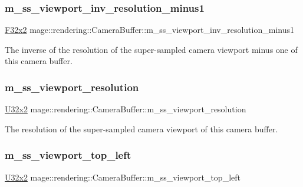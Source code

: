 \subsubsection{\texorpdfstring{m\+\_\+ss\+\_\+viewport\+\_\+inv\+\_\+resolution\+\_\+minus1}{m\_ss\_viewport\_inv\_resolution\_minus1}}
{\footnotesize\ttfamily \hyperlink{namespacemage_aa87237ad091f5cd7da612b8523fc108f}{F32x2} mage\+::rendering\+::\+Camera\+Buffer\+::m\+\_\+ss\+\_\+viewport\+\_\+inv\+\_\+resolution\+\_\+minus1}

The inverse of the resolution of the super-\/sampled camera viewport minus one of this camera buffer. \hypertarget{structmage_1_1rendering_1_1_camera_buffer_a96b17352187228ee2265be33d3f2d159}{}\label{structmage_1_1rendering_1_1_camera_buffer_a96b17352187228ee2265be33d3f2d159} 
\subsubsection{\texorpdfstring{m\+\_\+ss\+\_\+viewport\+\_\+resolution}{m\_ss\_viewport\_resolution}}
{\footnotesize\ttfamily \hyperlink{namespacemage_a88e05bff0300120c013285d3dcad95c5}{U32x2} mage\+::rendering\+::\+Camera\+Buffer\+::m\+\_\+ss\+\_\+viewport\+\_\+resolution}

The resolution of the super-\/sampled camera viewport of this camera buffer. \hypertarget{structmage_1_1rendering_1_1_camera_buffer_a9df1f7b7d6444504fcbc767171b5bfa7}{}\label{structmage_1_1rendering_1_1_camera_buffer_a9df1f7b7d6444504fcbc767171b5bfa7} 
\subsubsection{\texorpdfstring{m\+\_\+ss\+\_\+viewport\+\_\+top\+\_\+left}{m\_ss\_viewport\_top\_left}}
{\footnotesize\ttfamily \hyperlink{namespacemage_a88e05bff0300120c013285d3dcad95c5}{U32x2} mage\+::rendering\+::\+Camera\+Buffer\+::m\+\_\+ss\+\_\+viewport\+\_\+top\+\_\+left}


